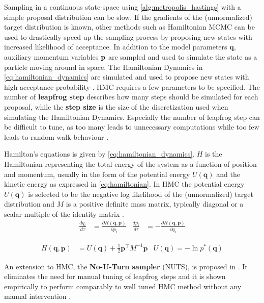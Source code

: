 Sampling in a continuous state-space using \cref{alg:metropolis_hastings} with a simple proposal distribution can be slow. If the gradients of the (unnormalized) target distribution is known, other methods such as Hamiltonian MCMC can be used to drastically speed up the sampling process by proposing new states with increased likelihood of acceptance. In addition to the model parameters $\mathbf{q}$, auxiliary momentum variables $\bf p$ are sampled and used to simulate the state as a particle moving around in space. The Hamiltonian Dynamics in \cref{eq:hamiltonian_dynamics} are simulated and used to propose new states with high acceptance probability \cite{neal2012mcmc,murphy,hoffman2011nouturn,robert2018accelerating}. HMC requires a few parameters to be specified. The number of \textbf{leapfrog step} describes how many steps should be simulated for each proposal, while the \textbf{step size} is the size of the discretization used when simulating the Hamiltonian Dynamics. Especially the number of leapfrog step can be difficult to tune, as too many leads to unnecessary computations while too few leads to random walk behaviour \cite{hoffman2011nouturn}. 

Hamilton's equations is given by \cref{eq:hamiltonian_dynamics}. $H$ is the Hamiltonian representing the total energy of the system as a function of position and momentum, usually in the form of the potential energy $U(\mathbf{q})$ and the kinetic energy as expressed in \cref{eq:hamiltonian}. In HMC the potential energy $U(\mathbf{q})$ is selected to be the negative log likelihood of the (unnormalized) target distribution and $M$ is a positive definite mass matrix, typically diagonal or a scalar multiple of the identity matrix \cite{neal2012mcmc}. 
\begin{align}\label{eq:hamiltonian_dynamics}
    \frac{d q_i}{d\tau} &= \frac{\partial H(\mathbf{q}, \mathbf{p})}{\partial p_i} & \frac{d p_i}{d\tau} &= -\frac{\partial H(\mathbf{q}, \mathbf{p})}{\partial q_i}
\end{align}

\begin{align}\label{eq:hamiltonian}
    H(\mathbf{q}, \mathbf{p}) &= U(\mathbf{q}) + \frac{1}{2} \mathbf{p}^\intercal M^{-1} \mathbf{p} & U(\mathbf{q}) = - \ln p^*(\mathbf{q})
\end{align}

An extension to HMC, the \textbf{No-U-Turn sampler} (NUTS), is proposed in \cite{hoffman2011nouturn}. It eliminates the need for manual tuning of leapfrog steps and it is shown empirically to perform comparably to well tuned HMC method without any manual intervention \cite{hoffman2011nouturn}.



